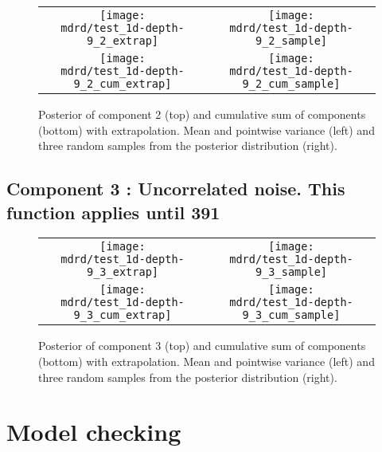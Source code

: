 \documentclass{article} %
\begin{document}


\begin{figure}[H]
\newcommand{\wmgd}{0.5\columnwidth}
\newcommand{\hmgd}{3.0cm}
\newcommand{\mdrd}{test_1d-depth-9}
\newcommand{\mbm}{\hspace{-0.3cm}}
\begin{tabular}{cc}
\mbm \texttt{[image: \\mdrd/test\_1d-depth-9\_2\_extrap]} & \texttt{[image: \\mdrd/test\_1d-depth-9\_2\_sample]} \\
\mbm \texttt{[image: \\mdrd/test\_1d-depth-9\_2\_cum\_extrap]} & \texttt{[image: \\mdrd/test\_1d-depth-9\_2\_cum\_sample]}
\end{tabular}
\caption{Posterior of component 2 (top) and cumulative sum of components (bottom) with extrapolation. Mean and pointwise variance (left) and three random samples from the posterior distribution (right).}
\label{fig:extrap2}
\end{figure}

\subsection{Component 3 : Uncorrelated noise. This function applies until  391}



\begin{figure}[H]
\newcommand{\wmgd}{0.5\columnwidth}
\newcommand{\hmgd}{3.0cm}
\newcommand{\mdrd}{test_1d-depth-9}
\newcommand{\mbm}{\hspace{-0.3cm}}
\begin{tabular}{cc}
\mbm \texttt{[image: \\mdrd/test\_1d-depth-9\_3\_extrap]} & \texttt{[image: \\mdrd/test\_1d-depth-9\_3\_sample]} \\
\mbm \texttt{[image: \\mdrd/test\_1d-depth-9\_3\_cum\_extrap]} & \texttt{[image: \\mdrd/test\_1d-depth-9\_3\_cum\_sample]}
\end{tabular}
\caption{Posterior of component 3 (top) and cumulative sum of components (bottom) with extrapolation. Mean and pointwise variance (left) and three random samples from the posterior distribution (right).}
\label{fig:extrap3}
\end{figure}

\section{Model checking}
\label{sec:check}
\end{document}
